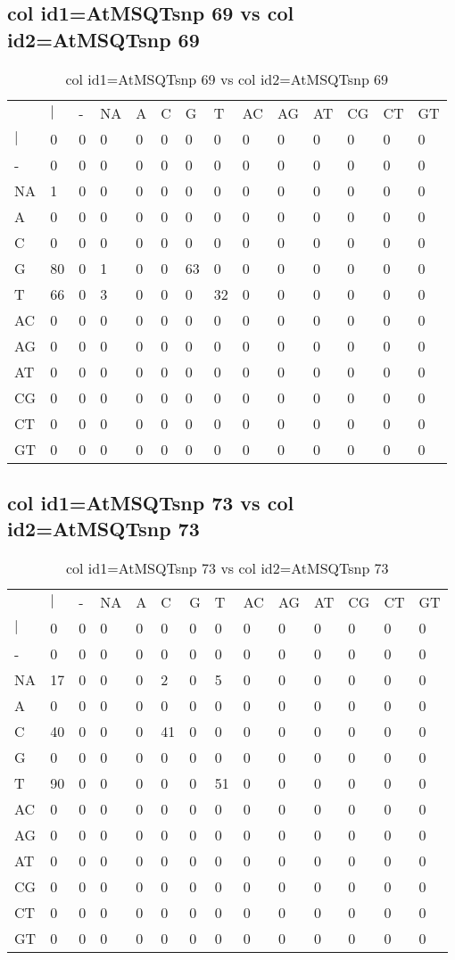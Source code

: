 \subsection{col id1=AtMSQTsnp 69 vs col id2=AtMSQTsnp 69}
\begin{center}
\begin{longtable}{|l|l|l|l|l|l|l|l|l|l|l|l|l|l|}
\caption{col id1=AtMSQTsnp 69 vs col id2=AtMSQTsnp 69} \label{table_dm768}\\
\hline
\\
\hline
&$|$&-&NA&A&C&G&T&AC&AG&AT&CG&CT&GT\\
$|$&0&0&0&0&0&0&0&0&0&0&0&0&0\\
-&0&0&0&0&0&0&0&0&0&0&0&0&0\\
NA&1&0&0&0&0&0&0&0&0&0&0&0&0\\
A&0&0&0&0&0&0&0&0&0&0&0&0&0\\
C&0&0&0&0&0&0&0&0&0&0&0&0&0\\
G&80&0&1&0&0&63&0&0&0&0&0&0&0\\
T&66&0&3&0&0&0&32&0&0&0&0&0&0\\
AC&0&0&0&0&0&0&0&0&0&0&0&0&0\\
AG&0&0&0&0&0&0&0&0&0&0&0&0&0\\
AT&0&0&0&0&0&0&0&0&0&0&0&0&0\\
CG&0&0&0&0&0&0&0&0&0&0&0&0&0\\
CT&0&0&0&0&0&0&0&0&0&0&0&0&0\\
GT&0&0&0&0&0&0&0&0&0&0&0&0&0\\
\hline
\end{longtable}
\end{center}

\subsection{col id1=AtMSQTsnp 73 vs col id2=AtMSQTsnp 73}
\begin{center}
\begin{longtable}{|l|l|l|l|l|l|l|l|l|l|l|l|l|l|}
\caption{col id1=AtMSQTsnp 73 vs col id2=AtMSQTsnp 73} \label{table_dm770}\\
\hline
\\
\hline
&$|$&-&NA&A&C&G&T&AC&AG&AT&CG&CT&GT\\
$|$&0&0&0&0&0&0&0&0&0&0&0&0&0\\
-&0&0&0&0&0&0&0&0&0&0&0&0&0\\
NA&17&0&0&0&2&0&5&0&0&0&0&0&0\\
A&0&0&0&0&0&0&0&0&0&0&0&0&0\\
C&40&0&0&0&41&0&0&0&0&0&0&0&0\\
G&0&0&0&0&0&0&0&0&0&0&0&0&0\\
T&90&0&0&0&0&0&51&0&0&0&0&0&0\\
AC&0&0&0&0&0&0&0&0&0&0&0&0&0\\
AG&0&0&0&0&0&0&0&0&0&0&0&0&0\\
AT&0&0&0&0&0&0&0&0&0&0&0&0&0\\
CG&0&0&0&0&0&0&0&0&0&0&0&0&0\\
CT&0&0&0&0&0&0&0&0&0&0&0&0&0\\
GT&0&0&0&0&0&0&0&0&0&0&0&0&0\\
\hline
\end{longtable}
\end{center}

